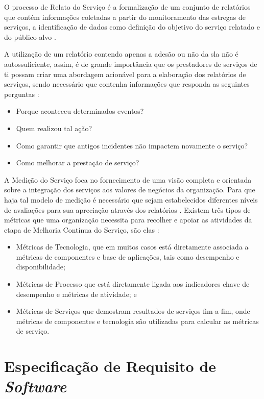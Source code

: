 O processo de Relato do Serviço é a formalização de um conjunto de relatórios que contém informações coletadas a partir do monitoramento das estregas de serviços, a identificação de dados como definição do objetivo do serviço relatado e do público-alvo \cite{abreu2012implantando}.

A utilização de um relatório contendo apenas a adesão ou não da \acrshort{sla} não é autossuficiente, assim, é de grande importância que os prestadores de serviços de \acrshort{ti} possam criar uma abordagem acionável para a elaboração dos relatórios de serviços, sendo necessário que contenha informações que responda as seguintes perguntas \cite{introductoryoverviewofitil}: 

\begin{itemize}
    \item Porque aconteceu determinados eventos?
    \item Quem realizou tal ação?
    \item Como garantir que antigos incidentes não impactem novamente o serviço?
    \item Como melhorar a prestação de serviço?
\end{itemize}

A Medição do Serviço foca no fornecimento de uma visão completa e orientada sobre a integração dos serviços aos valores de negócios da organização. Para que haja tal modelo de medição é necessário que sejam estabelecidos diferentes níveis de avaliações para sua apreciação através dos relatórios \cite{abreu2012implantando}. Existem três tipos de métricas que uma organização necessita para recolher e apoiar as atividades da etapa de Melhoria Contínua do Serviço, são elas \cite{introductoryoverviewofitil}: 

\begin{itemize}
    \item Métricas de Tecnologia, que em muitos casos está diretamente associada a métricas de componentes e base de aplicações, tais como desempenho e disponibilidade;
    \item Métricas de Processo que está diretamente ligada aos indicadores chave de desempenho e métricas de atividade; e
    \item Métricas de Serviços que demostram resultados de serviços fim-a-fim, onde métricas de componentes e tecnologia são utilizadas para calcular as métricas de serviço.
\end{itemize}

\section{Especificação de Requisito de \textit{Software}}


